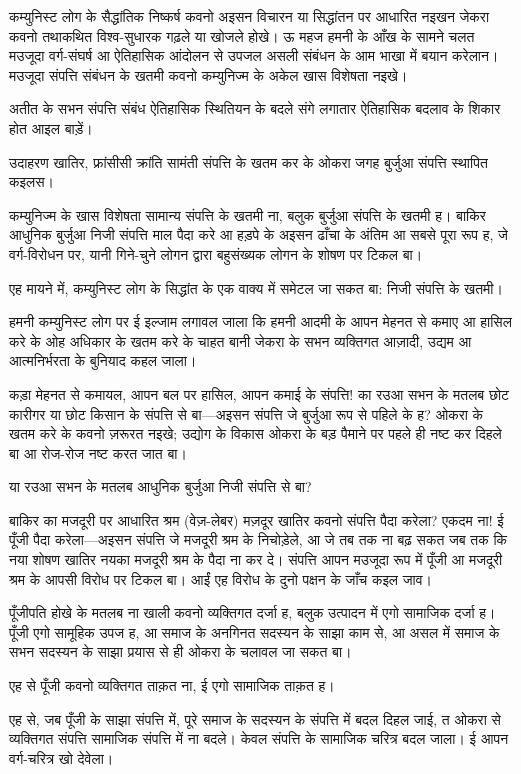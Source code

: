 \documentclass[12pt,a4paper,oneside]{book}
\begin{document}
कम्युनिस्ट लोग के सैद्धांतिक निष्कर्ष कवनो अइसन विचारन या सिद्धांतन पर आधारित नइखन जेकरा कवनो तथाकथित विश्व-सुधारक गढ़ले या खोजले होखे। ऊ महज हमनी के आँख के सामने चलत मउजूदा वर्ग-संघर्ष आ ऐतिहासिक आंदोलन से उपजल असली संबंधन के आम भाखा में बयान करेलान। मउजूदा संपत्ति संबंधन के खतमी कवनो कम्युनिज्म के अकेल खास विशेषता नइखे।

अतीत के सभन संपत्ति संबंध ऐतिहासिक स्थितियन के बदले संगे लगातार ऐतिहासिक बदलाव के शिकार होत आइल बाड़ें।

उदाहरण खातिर, फ्रांसीसी क्रांति सामंती संपत्ति के खतम कर के ओकरा जगह बुर्जुआ संपत्ति स्थापित कइलस।

कम्युनिज्म के खास विशेषता सामान्य संपत्ति के खतमी ना, बलुक बुर्जुआ संपत्ति के खतमी ह। बाकिर आधुनिक बुर्जुआ निजी संपत्ति माल पैदा करे आ हड़पे के अइसन ढाँचा के अंतिम आ सबसे पूरा रूप ह, जे वर्ग-विरोधन पर, यानी गिने-चुने लोगन द्वारा बहुसंख्यक लोगन के शोषण पर टिकल बा।

एह मायने में, कम्युनिस्ट लोग के सिद्धांत के एक वाक्य में समेटल जा सकत बा: निजी संपत्ति के खतमी।

हमनी कम्युनिस्ट लोग पर ई इल्जाम लगावल जाला कि हमनी आदमी के आपन मेहनत से कमाए आ हासिल करे के ओह अधिकार के खतम करे के चाहत बानी जेकरा के सभन व्यक्तिगत आज़ादी, उद्यम आ आत्मनिर्भरता के बुनियाद कहल जाला।

कड़ा मेहनत से कमायल, आपन बल पर हासिल, आपन कमाई के संपत्ति! का रउआ सभन के मतलब छोट कारीगर या छोट किसान के संपत्ति से बा—अइसन संपत्ति जे बुर्जुआ रूप से पहिले के ह? ओकरा के खतम करे के कवनो ज़रूरत नइखे; उद्योग के विकास ओकरा के बड़ पैमाने पर पहले ही नष्ट कर दिहले बा आ रोज-रोज नष्ट करत जात बा।

या रउआ सभन के मतलब आधुनिक बुर्जुआ निजी संपत्ति से बा?

बाकिर का मजदूरी पर आधारित श्रम (वेज़-लेबर) मज़दूर खातिर कवनो संपत्ति पैदा करेला? एकदम ना! ई पूँजी पैदा करेला—अइसन संपत्ति जे मजदूरी श्रम के निचोड़ेले, आ जे तब तक ना बढ़ सकत जब तक कि नया शोषण खातिर नयका मजदूरी श्रम के पैदा ना कर दे। संपत्ति आपन मउजूदा रूप में पूँजी आ मजदूरी श्रम के आपसी विरोध पर टिकल बा। आईं एह विरोध के दुनो पक्षन के जाँच कइल जाव।

पूँजीपति होखे के मतलब ना खाली कवनो व्यक्तिगत दर्जा ह, बलुक उत्पादन में एगो सामाजिक दर्जा ह। पूँजी एगो सामूहिक उपज ह, आ समाज के अनगिनत सदस्यन के साझा काम से, आ असल में समाज के सभन सदस्यन के साझा प्रयास से ही ओकरा के चलावल जा सकत बा।

एह से पूँजी कवनो व्यक्तिगत ताक़त ना, ई एगो सामाजिक ताक़त ह।

एह से, जब पूँजी के साझा संपत्ति में, पूरे समाज के सदस्यन के संपत्ति में बदल दिहल जाई, त ओकरा से व्यक्तिगत संपत्ति सामाजिक संपत्ति में ना बदले। केवल संपत्ति के सामाजिक चरित्र बदल जाला। ई आपन वर्ग-चरित्र खो देवेला।
\end{document}
